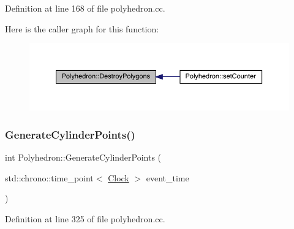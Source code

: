 Definition at line 168 of file polyhedron.\+cc.

Here is the caller graph for this function\+:
\nopagebreak
\begin{figure}[H]
\begin{center}
\leavevmode
\includegraphics[width=350pt]{class_polyhedron_ae372d216765d48b9423ee37a8bf8b282_icgraph}
\end{center}
\end{figure}
\mbox{\label{class_polyhedron_a642a64ae8cde5e2a9f15334e151fd3f9}} 
\subsubsection{\texorpdfstring{Generate\+Cylinder\+Points()}{GenerateCylinderPoints()}}
{\footnotesize\ttfamily int Polyhedron\+::\+Generate\+Cylinder\+Points (\begin{DoxyParamCaption}\item[{std\+::chrono\+::time\+\_\+point$<$ \hyperlink{universe_8h_a0ef8d951d1ca5ab3cfaf7ab4c7a6fd80}{Clock} $>$}]{event\+\_\+time }\end{DoxyParamCaption})}



Definition at line 325 of file polyhedron.\+cc.

